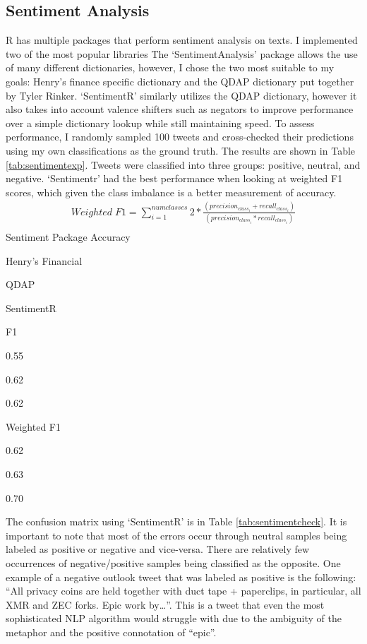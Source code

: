 \documentclass[12pt,twoside]{dukestatscithesis}
\begin{document}
\subsection{Sentiment Analysis}\label{sentiment-analysis}

R has multiple packages that perform sentiment analysis on texts. I
implemented two of the most popular libraries The `SentimentAnalysis'
package allows the use of many different dictionaries, however, I chose
the two most suitable to my goals: Henry's finance specific dictionary
and the QDAP dictionary put together by Tyler Rinker. `SentimentR'
similarly utilizes the QDAP dictionary, however it also takes into
account valence shifters such as negators to improve performance over a
simple dictionary lookup while still maintaining speed. To assess
performance, I randomly sampled 100 tweets and cross-checked their
predictions using my own classifications as the ground truth. The
results are shown in Table \ref{tab:sentimentexp}. Tweets were
classified into three groups: positive, neutral, and negative.
`Sentimentr' had the best performance when looking at weighted F1
scores, which given the class imbalance is a better measurement of
accuracy.
\begin{align}
  Weighted \; F1 = \sum_{i=1}^{numclasses}{2*\frac{(precision_{class_i} + recall_{class_i})}{(precision_{class_i}*recall_{class_i})}} \label{eq:1} \\ 
\end{align}
\label{tab:sentimentexp}Sentiment Package Accuracy

Henry's Financial

QDAP

SentimentR

F1

0.55

0.62

0.62

Weighted F1

0.62

0.63

0.70

The confusion matrix using `SentimentR' is in Table
\ref{tab:sentimentcheck}. It is important to note that most of the
errors occur through neutral samples being labeled as positive or
negative and vice-versa. There are relatively few occurrences of
negative/positive samples being classified as the opposite. One example
of a negative outlook tweet that was labeled as positive is the
following: ``All privacy coins are held together with duct tape +
paperclips, in particular, all XMR and ZEC forks. Epic work
by\ldots{}''. This is a tweet that even the most sophisticated NLP
algorithm would struggle with due to the ambiguity of the metaphor and
the positive connotation of ``epic''.
\end{document}
